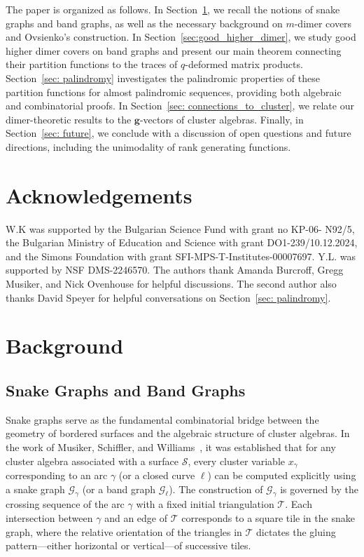 \documentclass[11pt]{amsart}
\theoremstyle{definition}
\theoremstyle{remark}
\numberwithin{equation}{section}
\begin{document}
The paper is organized as follows. In Section~\ref{sec:background}, we recall the notions of snake graphs and band graphs, as well as the necessary background on $m$-dimer covers and Ovsienko's construction. In Section~\ref{sec:good_higher_dimer}, we study good higher dimer covers on band graphs and present our main theorem connecting their partition functions to the traces of $q$-deformed matrix products. Section~\ref{sec: palindromy} investigates the palindromic properties of these partition functions for almost palindromic sequences, providing both algebraic and combinatorial proofs. In Section~\ref{sec: connections_to_cluster}, we relate our dimer-theoretic results to the $\mathbf{g}$-vectors of cluster algebras. Finally, in Section~\ref{sec: future}, we conclude with a discussion of open questions and future directions, including the unimodality of rank generating functions.

\section*{Acknowledgements}

W.K was supported by the Bulgarian Science Fund with grant no KP-06- N92/5, the Bulgarian Ministry of Education and Science with grant DO1-239/10.12.2024, and the Simons Foundation with grant SFI-MPS-T-Institutes-00007697. Y.L. was supported by NSF DMS-2246570. The authors thank Amanda Burcroff, Gregg Musiker, and Nick Ovenhouse for helpful discussions. The second author also thanks David Speyer for helpful conversations on Section~\ref{sec: palindromy}.


\section{Background}\label{sec:background}

\subsection{Snake Graphs and Band Graphs}

Snake graphs serve as the fundamental combinatorial bridge between the geometry of bordered surfaces and the algebraic structure of cluster algebras. In the work of Musiker, Schiffler, and Williams~\cite{musiker2011positivity}, it was established that for any cluster algebra associated with a surface $\mathcal{S}$, every cluster variable $x_\gamma$ corresponding to an arc $\gamma$ (or a closed curve $\ell$) can be computed explicitly using a snake graph $\mathcal{G}_\gamma$ (or a band graph $\mathcal{G}_\ell$). The construction of $\mathcal{G}_\gamma$ is governed by the crossing sequence of the arc $\gamma$ with a fixed initial triangulation $\mathcal{T}$. Each intersection between $\gamma$ and an edge of $\mathcal{T}$ corresponds to a square tile in the snake graph, where the relative orientation of the triangles in $\mathcal{T}$ dictates the gluing pattern—either horizontal or vertical—of successive tiles.
\end{document}
